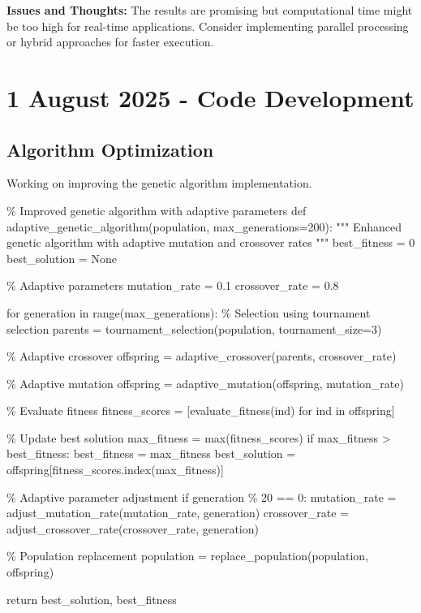 \documentclass[12pt,a4paper,twoside]{article}
\begin{document}
\begin{experiment}
\textbf{Issues and Thoughts:}
The results are promising but computational time might be too high for real-time applications. Consider implementing parallel processing or hybrid approaches for faster execution.
\end{experiment}


\section{1 August 2025 - Code Development}

\subsection{Algorithm Optimization}
Working on improving the genetic algorithm implementation.

\begin{codebox}
\% Improved genetic algorithm with adaptive parameters
def adaptive\_genetic\_algorithm(population, max\_generations=200):
    """
    Enhanced genetic algorithm with adaptive mutation and crossover rates
    """
    best\_fitness = 0
    best\_solution = None
    
    \% Adaptive parameters
    mutation\_rate = 0.1
    crossover\_rate = 0.8
    
    for generation in range(max\_generations):
        \% Selection using tournament selection
        parents = tournament\_selection(population, tournament\_size=3)
        
        \% Adaptive crossover
        offspring = adaptive\_crossover(parents, crossover\_rate)
        
        \% Adaptive mutation
        offspring = adaptive\_mutation(offspring, mutation\_rate)
        
        \% Evaluate fitness
        fitness\_scores = [evaluate\_fitness(ind) for ind in offspring]
        
        \% Update best solution
        max\_fitness = max(fitness\_scores)
        if max\_fitness > best\_fitness:
            best\_fitness = max\_fitness
            best\_solution = offspring[fitness\_scores.index(max\_fitness)]
        
        \% Adaptive parameter adjustment
        if generation \% 20 == 0:
            mutation\_rate = adjust\_mutation\_rate(mutation\_rate, generation)
            crossover\_rate = adjust\_crossover\_rate(crossover\_rate, generation)
        
        \% Population replacement
        population = replace\_population(population, offspring)
    
    return best\_solution, best\_fitness
\end{codebox}
\end{document}

